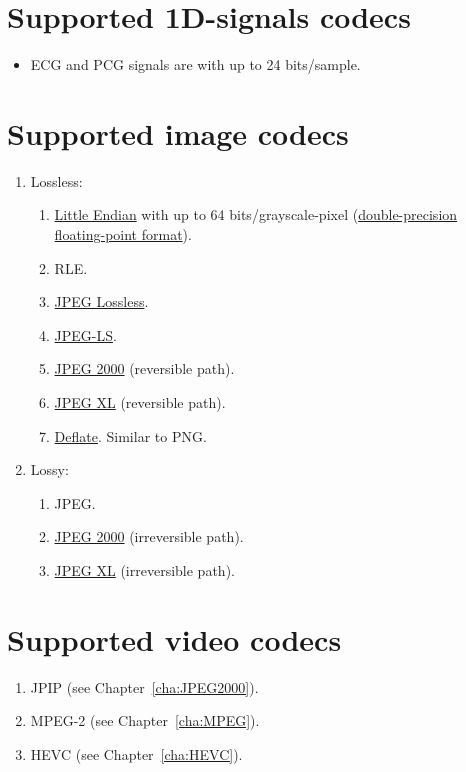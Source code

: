 \section{Supported 1D-signals codecs}
\begin{itemize}
\item \gls{ECG} and \gls{PCG} signals are  with up to 24
  bits/sample.
\end{itemize}

\section{Supported image codecs}
\begin{enumerate}
\item Lossless:
  \begin{enumerate}
  \item {}
    \href{https://en.wikipedia.org/wiki/Endianness}{Little Endian}
    with up to 64 bits/grayscale-pixel
    (\href{https://en.wikipedia.org/wiki/Double-precision_floating-point_format}{double-precision
      floating-point format}).
  \item \gls{RLE}.
  \item \href{https://en.wikipedia.org/wiki/Lossless_JPEG}{JPEG Lossless}.
  \item \href{https://en.wikipedia.org/wiki/Lossless_JPEG\#JPEG_LS}{JPEG-LS}.
  \item \href{https://en.wikipedia.org/wiki/JPEG_2000}{JPEG 2000}
    (reversible path).
  \item \href{https://en.wikipedia.org/wiki/JPEG_XL}{JPEG XL}
    (reversible path).
  \item \href{https://en.wikipedia.org/wiki/Deflate}{Deflate}. Similar
    to \gls{PNG}.
  \end{enumerate}
  \newpage
\item Lossy:
  \begin{enumerate}
  \item \gls{JPEG}.
  \item \href{https://en.wikipedia.org/wiki/JPEG_2000}{JPEG 2000}
    (irreversible path).
  \item \href{https://en.wikipedia.org/wiki/JPEG_XL}{JPEG XL}
    (irreversible path).
  \end{enumerate}
\end{enumerate}

\section{Supported video codecs}
\begin{enumerate}
\item \gls{JPIP} (see Chapter~\ref{cha:JPEG2000}).
\item \gls{MPEG}-2 (see Chapter~\ref{cha:MPEG}).
\item \gls{HEVC} (see Chapter~\ref{cha:HEVC}).
\end{enumerate}


